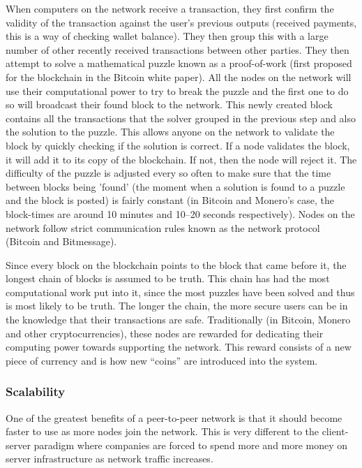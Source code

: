 \documentclass{article}
\begin{document}
When computers on the network receive a transaction, they first confirm the validity of the transaction against the user's previous outputs (received payments, this is a way of checking wallet balance). They then group this with a large number of other recently received transactions between other parties. They then attempt to solve a mathematical puzzle known as a proof-of-work (first proposed for the blockchain in the Bitcoin white paper\cite{bitcoin_paper}). All the nodes on the network will use their computational power to try to break the puzzle and the first one to do so will broadcast their found block to the network. This newly created block contains all the transactions that the solver grouped in the previous step and also the solution to the puzzle. This allows anyone on the network to validate the block by quickly checking if the solution is correct. If a node validates the block, it will add it to its copy of the blockchain. If not, then the node will reject it. The difficulty of the puzzle is adjusted every so often to make sure that the time between blocks being 'found' (the moment when a solution is found to a puzzle and the block is posted) is fairly constant (in Bitcoin and Monero's case, the block-times are around 10 minutes and 10--20 seconds respectively). Nodes on the network follow strict communication rules known as the network protocol (Bitcoin\cite{bitcoin_docs} and Bitmessage\cite{bitmessage_docs}).

Since every block on the blockchain points to the block that came before it, the longest chain of blocks is assumed to be truth. This chain has had the most computational work put into it, since the most puzzles have been solved and thus is most likely to be truth. The longer the chain, the more secure users can be in the knowledge that their transactions are safe. Traditionally (in Bitcoin, Monero and other cryptocurrencies), these nodes are rewarded for dedicating their computing power towards supporting the network. This reward consists of a new piece of currency and is how new ``coins'' are introduced into the system.

\newpage

\subsubsection{Scalability}
One of the greatest benefits of a peer-to-peer network is that it should become faster to use as more nodes join the network. This is very different to the client-server paradigm where companies are forced to spend more and more money on server infrastructure as network traffic increases.
\end{document}
